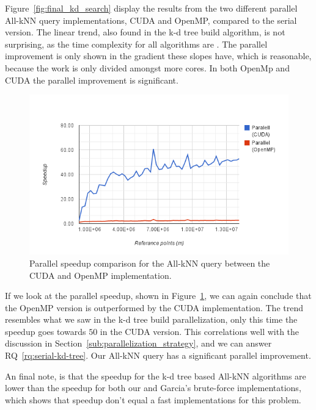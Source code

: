 Figure~\ref{fig:final_kd_search} display the results from the two different parallel All-kNN query implementations, CUDA and OpenMP, compared to the serial version. The linear trend, also found in the k-d tree build algorithm, is not surprising, as the time complexity for all algorithms are . The parallel improvement is only shown in the gradient these slopes have, which is reasonable, because the work is only divided amongst more cores. In both OpenMp and CUDA the parallel improvement is significant.

\begin{figure}[ht!]
    \centering
    \includegraphics[width=120mm]{../gfx/final_kd_search_speedup.png}
    \caption{Parallel speedup comparison for the All-kNN query between the CUDA and OpenMP implementation.}
    \label{fig:final_kd_search_speedup}
\end{figure}

If we look at the parallel speedup, shown in Figure~\ref{fig:final_kd_search_speedup}, we can again conclude that the OpenMP version is outperformed by the CUDA implementation. The trend resembles what we saw in the k-d tree build parallelization, only this time the speedup goes towards $50$ in the CUDA version. This correlations well with the discussion in Section~\ref{sub:parallelization_strategy}, and we can answer RQ~\ref{rq:serial-kd-tree}. Our All-kNN query has a significant parallel improvement.

An final note, is that the speedup for the k-d tree based All-kNN algorithms are lower than the speedup for both our and Garcia's\cite{Garcia2008} brute-force implementations, which shows that speedup don't equal a fast implementations for this problem.
